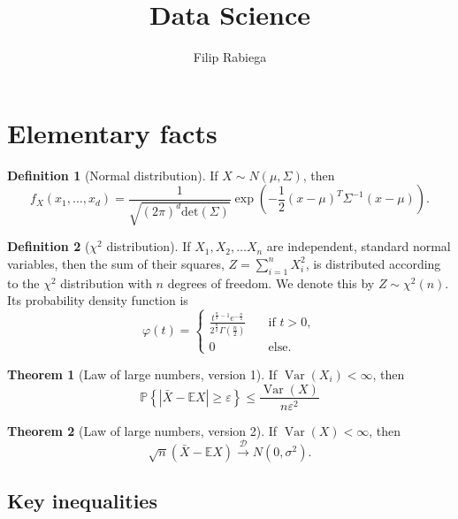 \documentclass{article}
\title{Data Science}
\author{Filip Rabiega}
\theoremstyle{definition}
\newtheorem{theorem}{Theorem}[section]
\newtheorem{definition}{Definition}[section]
\begin{document}
\maketitle
\section{Elementary facts}

\begin{definition}[Normal distribution]
  If \( X \sim N(\mu, \Sigma) \), then
  \[
    f_X (x_1, \dots, x_d) =
    \frac{1}{\sqrt{\left( 2 \pi \right) ^{d}  \text{det}(\Sigma)}}
    \exp\left(-\frac{1}{2}\left( x - \mu \right)^{T} \Sigma^{-1}
    \left( x - \mu \right)\right).
  \]
\end{definition}

\begin{definition}[\( \chi^{2} \) distribution]
  If \( X_{1}, X_{2}, \dots X_{n} \) are independent, standard normal
  variables, then the sum of their squares, \( Z = \sum_{i=1}^{n}
  X_{i}^{2} \), is distributed according to the \( \chi^{2} \)
  distribution with \( n \) degrees of freedom. We denote this by \(
  Z \sim \chi^{2} (n) \). Its probability density function is
  \[
    \varphi(t) =
    \left\{
      \begin{align}
        \frac{t^{\frac{n}{2}-1}e^{-\frac{n}{2}}}{2^{\frac{n}{2}}\Gamma(\frac{n}{2})}
        & \quad \text{if } t > 0, \\
        0 & \quad \text{else}.
      \end{align}
      \right.
    \]
  \end{definition}

  \begin{theorem}[Law of large numbers, version 1]
    If \( \operatorname{Var}(X _{i} ) < \infty \), then
    \[
      \mathbb{P} \left\{ | \bar{X} - \mathbb{E}X | \geq \varepsilon \right\}
      \leq \frac{\operatorname{Var}(X)}{n\varepsilon^{2}}
    \]
  \end{theorem}

  \begin{theorem}[Law of large numbers, version 2]
    If \( \operatorname{Var}(X) < \infty  \), then
    \[
      \sqrt{n} \left( \bar{X} - \mathbb{E}X \right)
      \xrightarrow{\mathcal{D} } N(0,\sigma ^{2} ).
    \]
  \end{theorem}

  \subsection{Key inequalities}
\end{document}
